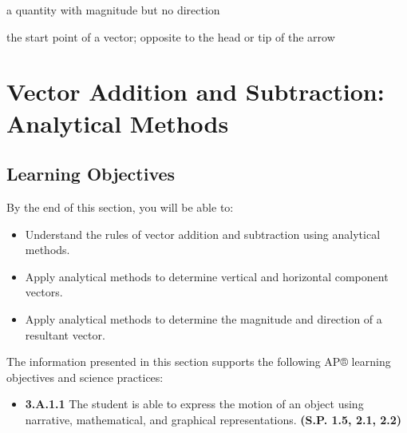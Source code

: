 \documentclass[
]{book}
\providecommand{\tightlist}{%
  \setlength{\itemsep}{0pt}\setlength{\parskip}{0pt}}
\newenvironment{learning-objectives}{}{}
\begin{document}
\begin{description}
\tightlist
\item[scalar]
a quantity with magnitude but no direction
\end{description}

\begin{description}
\tightlist
\item[tail]
the start point of a vector; opposite to the head or tip of the
arrow
\end{description}

\hypertarget{vector-addition-and-subtraction-analytical-methods}{%
\section{Vector Addition and Subtraction: Analytical Methods}\label{vector-addition-and-subtraction-analytical-methods}}

\hypertarget{fs-id1468448}{}
\begin{learning-objectives}

\hypertarget{learning-objectives-9}{%
\subsection{Learning Objectives}\label{learning-objectives-9}}

By the end of this section, you will be able to:

\begin{itemize}
\tightlist
\item
  Understand the rules of vector addition and subtraction using
  analytical methods.
\item
  Apply analytical methods to determine vertical and horizontal
  component vectors.
\item
  Apply analytical methods to determine the magnitude and direction of
  a resultant vector.
\end{itemize}

The information presented in this section supports the following AP®
learning objectives and science practices:

\begin{itemize}
\tightlist
\item
  \textbf{3.A.1.1} The student is able to express the motion of an object
  using narrative, mathematical, and graphical representations.
  \textbf{(S.P. 1.5, 2.1, 2.2)}
\end{itemize}

\end{learning-objectives}
\end{document}
